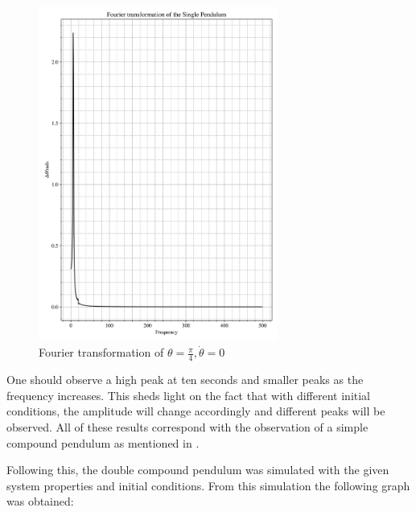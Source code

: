 \documentclass[12pt, a4paper]{article}
\begin{document}
\begin{figure}[H]
    \centering
    \includegraphics[width = 0.7\textwidth]{plots/Plot 2.5.png}\caption{Fourier transformation of \(\theta = \frac{\pi}{4}, \dot{\theta} = 0\)}\label{fig: fourier 1.2}
\end{figure}

One should observe a high peak at ten seconds and smaller peaks as the frequency increases. This sheds light on the fact that with different initial conditions, the amplitude will change accordingly and different peaks will be observed. All of these results correspond with the observation of a simple compound pendulum as mentioned in \cite{pedersen1977compound}. 

Following this, the double compound pendulum was simulated with the given system properties and initial conditions. From this simulation the following graph was obtained:
\end{document}

